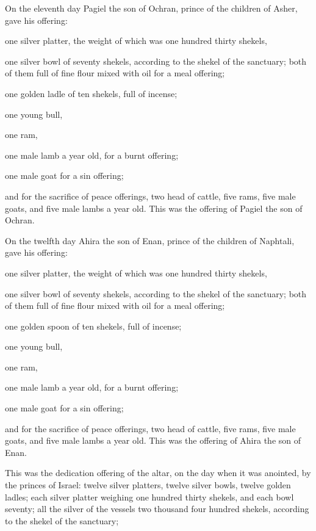 {\par }{\PP {}On the eleventh day Pagiel the son of Ochran, prince of the children of Asher,
gave his offering:
\par }{\PP one silver platter, the weight of which was one hundred thirty shekels,
\par }{\PP one silver bowl of seventy shekels, according to the shekel of the sanctuary; both of them full of fine flour mixed with oil for a meal offering;
\par }{\PP {}one golden ladle of ten shekels, full of incense;
\par }{\PP {}one young bull,
\par }{\PP one ram,
\par }{\PP one male lamb a year old, for a burnt offering;
\par }{\PP {}one male goat for a sin offering;
\par }{\PP {}and for the sacrifice of peace offerings, two head of cattle, five rams, five male goats, and five male lambs a year old. This was the offering of Pagiel the son of Ochran.
\par }{\PP {}On the twelfth day Ahira the son of Enan, prince of the children of Naphtali,
gave his offering:
\par }{\PP one silver platter, the weight of which was one hundred thirty shekels,
\par }{\PP one silver bowl of seventy shekels, according to the shekel of the sanctuary; both of them full of fine flour mixed with oil for a meal offering;
\par }{\PP {}one golden spoon of ten shekels, full of incense;
\par }{\PP {}one young bull,
\par }{\PP one ram,
\par }{\PP one male lamb a year old, for a burnt offering;
\par }{\PP {}one male goat for a sin offering;
\par }{\PP {}and for the sacrifice of peace offerings, two head of cattle, five rams, five male goats, and five male lambs a year old. This was the offering of Ahira the son of Enan.
\par }{\PP {}This was the dedication offering of the altar, on the day when it was anointed, by the princes of Israel: twelve silver platters, twelve silver bowls, twelve golden ladles;
each silver platter weighing one hundred thirty shekels, and each bowl seventy; all the silver of the vessels two thousand four hundred shekels, according to the shekel of the sanctuary;
}
